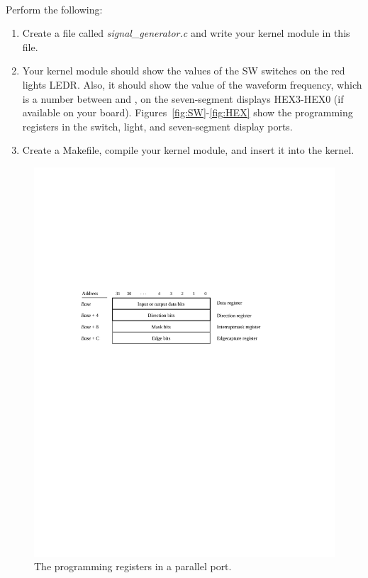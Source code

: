 \documentclass[epsfig,10pt,fullpage]{article}
\begin{document}
~\\
\noindent
Perform the following:

\begin{enumerate}
\item Create a file called {\it signal\_generator.c} and write your kernel module in this file.

\item Your kernel module should show the values of the SW switches on the red lights LEDR. 
Also, it should show the value of the waveform frequency, which is a number between 
and , on the seven-segment displays HEX3-HEX0 (if available on your board). 
Figures~\ref{fig:SW}-\ref{fig:HEX}
show the programming registers in the switch, light, and seven-segment display ports.

\item Create a Makefile, compile your kernel module, and insert it into the kernel. 
\end{enumerate}

\begin{figure}[htb]
	\begin{center}
	\includegraphics[scale=1]{figures/figureparallel.pdf}
	\end{center}
	\caption{The programming registers in a parallel port.}
\label{fig:parallel}
\end{figure}
\end{document}
